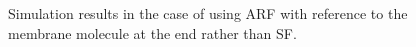 \documentclass[a4paper,12pt, oneside]{book}
\begin{document}
\begin{figure}[tbp]
 \caption{Simulation results in the case of using ARF with reference to the membrane molecule at the end rather than SF.}
 \label{fig:res2}
\end{figure}

\end{document}
